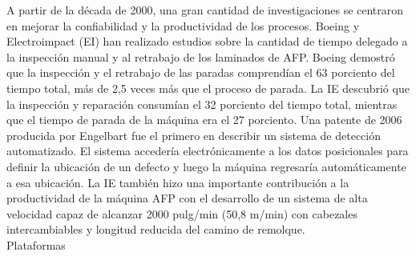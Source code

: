 A partir de la década de 2000, una gran cantidad de investigaciones se centraron en mejorar la confiabilidad y la productividad de los procesos. Boeing y Electroimpact (EI) han realizado estudios sobre la cantidad de tiempo delegado a la inspección manual y al retrabajo de los laminados de AFP. Boeing demostró que la inspección y el retrabajo de las paradas comprendían el 63 porciento del tiempo total, más de 2,5 veces más que el proceso de parada. La IE descubrió que la inspección y reparación consumían el 32 porciento del tiempo total, mientras que el tiempo de parada de la máquina era el 27 porciento. Una patente de 2006 producida por Engelbart fue el primero en describir un sistema de detección automatizado. El sistema accedería electrónicamente a los datos posicionales para definir la ubicación de un defecto y luego la máquina regresaría automáticamente a esa ubicación. La IE también hizo una importante contribución a la productividad de la máquina AFP con el desarrollo de un sistema de alta velocidad capaz de alcanzar 2000 pulg/min (50,8 m/min) con cabezales intercambiables y longitud reducida del camino de remolque.\\

Plataformas\\

